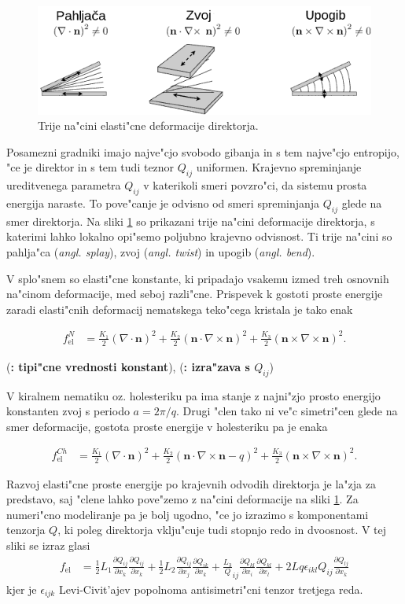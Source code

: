 \documentclass[a4paper,10pt]{article}
\newcommand{\todo}[1]{(\textbf{\textsmaller{TODO}: #1})}
\renewcommand{\vec}{\mathbf}
\newcommand{\angl}[1]{(\textit{angl. #1})}
\newcommand{\qodv}[2]{\ensuremath{\frac{\partial Q_{#1}}{\partial x_{#2}}}}
\begin{document}
\begin{figure}[h]
\begin{center}
  \includegraphics[width=.7\textwidth]{./Slike/tsb_slo}
  \caption{Trije na"cini elasti"cne deformacije direktorja. }
\label{fig:tsb}
\end{center}
\end{figure}
Posamezni gradniki imajo najve"cjo svobodo gibanja in s tem najve"cjo entropijo, "ce je direktor in s tem tudi teznor $Q_{ij}$ uniformen. 
Krajevno spreminjanje ureditvenega parametra $Q_{ij}$ v katerikoli smeri povzro"ci, da sistemu prosta energija naraste. 
To pove"canje je odvisno od smeri spreminjanja $Q_{ij}$ glede na smer direktorja. 
Na sliki \ref{fig:tsb} so prikazani trije na"cini deformacije direktorja, s katerimi lahko lokalno opi"semo poljubno krajevno odvisnost. 
Ti trije na"cini so pahlja"ca \angl{splay}, zvoj \angl{twist} in upogib \angl{bend}. 

V splo"snem so elasti"cne konstante, ki pripadajo vsakemu izmed treh osnovnih na"cinom deformacije, med seboj razli"cne. 
Prispevek k gostoti proste energije zaradi elasti"cnih deformacij nematskega teko"cega kristala je tako enak

\begin{align}
 f_{\mathrm{el}}^N &= \frac{K_1}{2} (\nabla \cdot \vec n)^2 + \frac{K_2}{2} (\vec n \cdot \nabla \times \vec n)^2 + \frac{K_3}{2} (\vec n \times \nabla \times \vec n)^2. 
\end{align}

\todo{tipi"cne vrednosti konstant}, \todo{izra"zava s $Q_{ij}$}

V kiralnem nematiku oz. holesteriku pa ima stanje z najni"zjo prosto energijo konstanten zvoj s periodo $a = 2\pi / q$.
Drugi "clen tako ni ve"c simetri"cen glede na smer deformacije, gostota proste energije v holesteriku pa je enaka

\begin{align}
 f_{\mathrm{el}}^{Ch} &= \frac{K_1}{2} (\nabla \cdot \vec n)^2 + \frac{K_2}{2} (\vec n \cdot \nabla \times \vec n - q)^2 + \frac{K_3}{2} (\vec n \times \nabla \times \vec n)^2. 
\end{align}

Razvoj elasti"cne proste energije po krajevnih odvodih direktorja je la"zja za predstavo, saj "clene lahko pove"zemo z na"cini deformacije na sliki \ref{fig:tsb}. 
Za numeri"cno modeliranje pa je bolj ugodno, "ce jo izrazimo s komponentami tenzorja $Q$, ki poleg direktorja vklju"cuje tudi stopnjo redo in dvoosnost\cite{copar-phd}. 
V tej sliki se izraz glasi
\begin{align}
 f_{\mathrm{el}} &= \frac{1}{2}L_1\qodv{ij}{k}\qodv{ij}{k} + \frac{1}{2}L_2 \qodv{ij}{j}\qodv{ik}{k} + \frac{L_3}Q_{ij}\qodv{kl}{i}\qodv{kl}{l} + 2Lq\epsilon_{ikl}Q_{ij}\qodv{lj}{k}
\end{align}
kjer je $\epsilon_{ijk}$ Levi-Civit'ajev popolnoma antisimetri"cni tenzor tretjega reda. 
\end{document}
